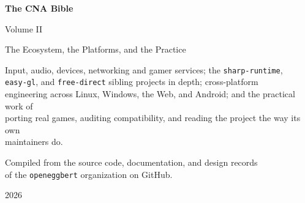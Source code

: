 \begin{titlepage}
\centering
\vspace*{3cm}
{\Huge\bfseries The CNA Bible\par}
\vspace{0.6cm}
{\Large Volume II \par}
{\large The Ecosystem, the Platforms, and the Practice\par}
\vspace{2.5cm}
{\large Input, audio, devices, networking and gamer services; the \texttt{sharp-runtime},\\
\texttt{easy-gl}, and \texttt{free-direct} sibling projects in depth; cross-platform\\
engineering across Linux, Windows, the Web, and Android; and the practical work of\\
porting real games, auditing compatibility, and reading the project the way its own\\
maintainers do.\par}
\vspace{3cm}
{\large Compiled from the source code, documentation, and design records\\
of the \texttt{openeggbert} organization on GitHub.\par}
\vfill
{\large 2026\par}
\end{titlepage}
